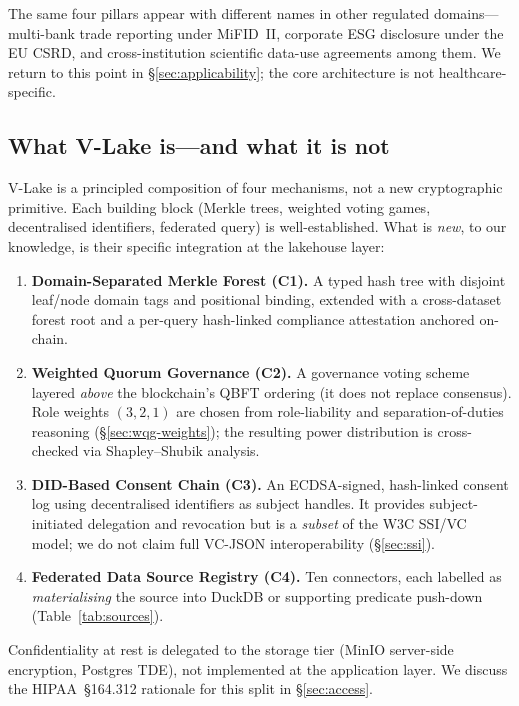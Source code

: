 \documentclass[10pt,twocolumn]{article}
\begin{document}
The same four pillars appear with different names in other
regulated domains---multi-bank trade reporting under MiFID~II,
corporate ESG disclosure under the EU CSRD, and cross-institution
scientific data-use agreements among them. We return to this
point in \S\ref{sec:applicability}; the core architecture is not
healthcare-specific.

\subsection{What V-Lake is---and what it is not}

V-Lake is a principled composition of four mechanisms, not a new
cryptographic primitive. Each building block (Merkle trees,
weighted voting games, decentralised identifiers, federated query)
is well-established. What is \emph{new}, to our knowledge, is
their specific integration at the lakehouse layer:

\begin{enumerate}[leftmargin=*,topsep=3pt,itemsep=2pt]
\item \textbf{Domain-Separated Merkle Forest (C1).}
  A typed hash tree with disjoint leaf/node domain tags and
  positional binding, extended with a cross-dataset forest root and
  a per-query hash-linked compliance attestation anchored on-chain.

\item \textbf{Weighted Quorum Governance (C2).}
  A governance voting scheme layered \emph{above} the blockchain's
  QBFT ordering (it does not replace consensus). Role weights
  $(3,2,1)$ are chosen from role-liability and
  separation-of-duties reasoning (\S\ref{sec:wqg-weights}); the
  resulting power distribution is cross-checked via
  Shapley--Shubik analysis.

\item \textbf{DID-Based Consent Chain (C3).}
  An ECDSA-signed, hash-linked consent log using decentralised
  identifiers as subject handles. It provides subject-initiated
  delegation and revocation but is a \emph{subset} of the W3C
  SSI/VC model; we do not claim full VC-JSON interoperability
  (\S\ref{sec:ssi}).

\item \textbf{Federated Data Source Registry (C4).}
  Ten connectors, each labelled as \emph{materialising} the source
  into DuckDB or supporting predicate push-down
  (Table~\ref{tab:sources}).
\end{enumerate}

\noindent
Confidentiality at rest is delegated to the storage tier
(MinIO server-side encryption, Postgres TDE), not implemented at
the application layer. We discuss the HIPAA~\S164.312 rationale
for this split in \S\ref{sec:access}.
\end{document}
